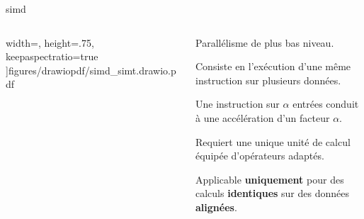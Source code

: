 \documentclass[../main.tex]{subfiles}
\begin{document}
\begin{frame}{\acrfull{simd}}
\begin{columns}
\begin{column}{.3\linewidth}
        width=\linewidth,
        height=.75\textheight,
        keepaspectratio=true
      ]{figures/drawiopdf/simd_simt.drawio.pdf}
    \end{column}
    \begin{column}{.7\linewidth}
      \begin{ctrlitemize}{.5 em}
        \item Parallélisme de plus bas niveau.
        \item Consiste en l'exécution d'une même instruction sur plusieurs données.
        \item Une instruction sur $\alpha$ entrées conduit à une accélération d'un facteur $\alpha$.
      \end{ctrlitemize}

      \vspace{2 em}

      \begin{ctrlitemize}{.5 em}
        \item Requiert une unique unité de calcul équipée d'opérateurs adaptés.
        \item Applicable \textbf{uniquement} pour des calculs \textbf{identiques} sur des données \textbf{alignées}.
      \end{ctrlitemize}
    \end{column}
  \end{columns}
\end{frame}
\end{document}

